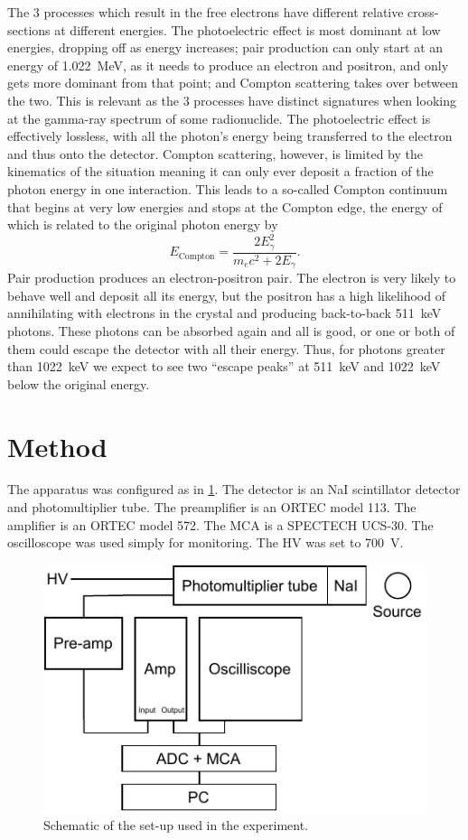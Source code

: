 \documentclass[11pt]{article}
\numberwithin{equation}{section}
\numberwithin{figure}{section}
\numberwithin{table}{section}
\begin{document}
The 3 processes which result in the free electrons have different relative cross-sections at different energies. The photoelectric effect is most dominant at low energies, dropping off as energy increases; pair production can only start at an energy of \SI{1.022}{\mega\electronvolt}, as it needs to produce an electron and positron, and only gets more dominant from that point; and Compton scattering takes over between the two. This is relevant as the 3 processes have distinct signatures when looking at the gamma-ray spectrum of some radionuclide. The photoelectric effect is effectively lossless, with all the photon's energy being transferred to the electron and thus onto the detector. Compton scattering, however, is limited by the kinematics of the situation meaning it can only ever deposit a fraction of the photon energy in one interaction. This leads to a so-called Compton continuum that begins at very low energies and stops at the Compton edge, the energy of which is related to the original photon energy by 
\begin{equation}
    E_\mathrm{Compton}=\frac{2E_\gamma^2}{m_e c^2 + 2E_\gamma}.
\end{equation}
Pair production produces an electron-positron pair. The electron is very likely to behave well and deposit all its energy, but the positron has a high likelihood of annihilating with electrons in the crystal and producing back-to-back \SI{511}{\kilo\electronvolt} photons. These photons can be absorbed again and all is good, or one or both of them could escape the detector with all their energy. Thus, for photons greater than \SI{1022}{\kilo\electronvolt} we expect to see two ``escape peaks'' at \SI{511}{\kilo\electronvolt} and \SI{1022}{\kilo\electronvolt} below the original energy. 

\section{Method}\label{sec:Method}
The apparatus was configured as in \cref{fig:Apparatus}. The detector is an NaI scintillator detector and photomultiplier tube. The preamplifier is an ORTEC model 113. The amplifier is an ORTEC model 572. The MCA is a SPECTECH UCS-30. The oscilloscope was used simply for monitoring. The HV was set to \SI{700}{\volt}.

\begin{figure}[h]
    \begin{center}
        \includegraphics[width=.6\textwidth]{Plots/apparatus.pdf}
        \caption{Schematic of the set-up used in the experiment.}
        \label{fig:Apparatus}
    \end{center}
\end{figure}
\end{document}
